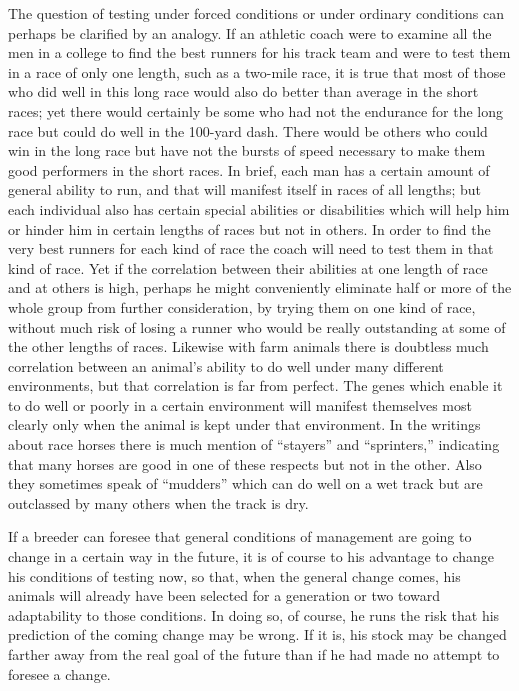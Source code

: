 The question of testing under forced conditions or under ordinary
conditions can perhaps be clarified by an analogy. If an athletic coach
were to examine all the men in a college to find the best runners for his
track team and were to test them in a race of only one length, such as a
two-mile race, it is true that most of those who did well in this long race
would also do better than average in the short races; yet there would
certainly be some who had not the endurance for the long race but
could do well in the 100-yard dash. There would be others who could
win in the long race but have not the bursts of speed necessary to make
them good performers in the short races. In brief, each man has a certain
amount of general ability to run, and that will manifest itself in
races of all lengths; but each individual also has certain special abilities
or disabilities which will help him or hinder him in certain lengths of
races but not in others. In order to find the very best runners for each
kind of race the coach will need to test them in that kind of race. Yet if
the correlation between their abilities at one length of race and at others
is high, perhaps he might conveniently eliminate half or more of the
whole group from further consideration, by trying them on one kind of
race, without much risk of losing a runner who would be really outstanding
at some of the other lengths of races. Likewise with farm animals
there is doubtless much correlation between an animal's ability to
do well under many different environments, but that correlation is far
from perfect. The genes which enable it to do well or poorly in a certain
environment will manifest themselves most clearly only when the animal
is kept under that environment. In the writings about race horses
there is much mention of ``stayers'' and ``sprinters,'' indicating that
many horses are good in one of these respects but not in the other. Also
they sometimes speak of ``mudders'' which can do well on a wet track
but are outclassed by many others when the track is dry.

If a breeder can foresee that general conditions of management are
going to change in a certain way in the future, it is of course to his
advantage to change his conditions of testing now, so that, when the
general change comes, his animals will already have been selected for a
generation or two toward adaptability to those conditions. In doing so,
of course, he runs the risk that his prediction of the coming change may
be wrong. If it is, his stock may be changed farther away from the real
goal of the future than if he had made no attempt to foresee a change.

